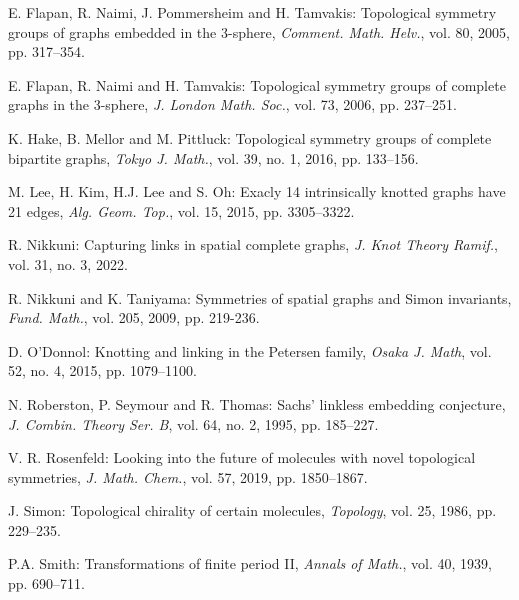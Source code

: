 \documentclass[11]{amsart}
\theoremstyle{definition}
\theoremstyle{remark}
\begin{document}
\begin{thebibliography}{10}
 E. Flapan, R. Naimi, J. Pommersheim and H. Tamvakis: Topological symmetry groups of graphs embedded in the 3-sphere, {\it Comment. Math. Helv.}, vol. 80, 2005, pp. 317--354.

 E. Flapan, R. Naimi and H. Tamvakis:  Topological symmetry groups of complete graphs in the 3-sphere, {\it J. London Math. Soc.}, vol. 73, 2006, pp. 237--251.


 K. Hake, B. Mellor and M. Pittluck:  Topological symmetry groups of complete bipartite graphs, {\it Tokyo J. Math.}, vol. 39, no. 1, 2016, pp. 133--156.

 M. Lee, H. Kim, H.J. Lee and S. Oh: Exacly 14 intrinsically knotted graphs have 21 edges, {\it Alg. Geom. Top.}, vol. 15, 2015, pp. 3305--3322.



 R. Nikkuni: Capturing links in spatial complete graphs, {\it J. Knot Theory Ramif.}, vol. 31, no. 3, 2022.

 R. Nikkuni and K. Taniyama: Symmetries of spatial graphs and Simon invariants, {\it Fund. Math.}, vol. 205, 2009, pp. 219-236.

 D. O'Donnol: Knotting and linking in the Petersen family, {\it Osaka J. Math}, vol. 52, no. 4, 2015, pp. 1079--1100.

 N. Roberston, P. Seymour and R. Thomas: Sachs' linkless embedding conjecture, {\it J. Combin. Theory Ser. B}, vol. 64, no. 2, 1995, pp. 185--227.

 V. R. Rosenfeld: Looking into the future of molecules with novel topological symmetries, {\it J. Math. Chem.}, vol. 57, 2019, pp. 1850--1867.

 J. Simon: Topological chirality of certain molecules, {\it Topology}, vol. 25, 1986, pp. 229--235.

 P.A. Smith: Transformations of finite period II, {\it Annals of Math.}, vol. 40, 1939, pp. 690--711.


\end{thebibliography}
%
\end{document}
